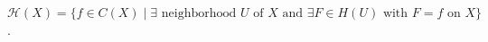 
$\mathcal{H}(X) = \{f \in C(X) \mid \exists \text{ neighborhood } U \text{ of } X \text{ and } \exists F \in H(U) \text{ with } F = f \text{ on } X\}$.
